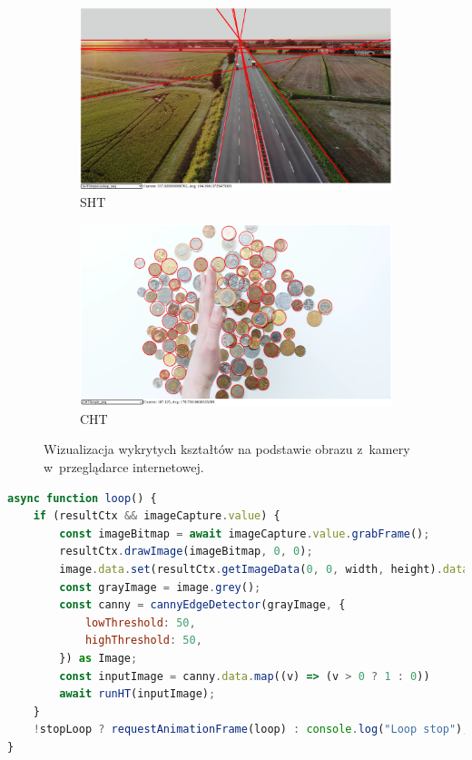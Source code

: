 \begin{figure}
    \centering
    \begin{subfigure}{0.48\textwidth}
        \centering
        \includegraphics[width=\linewidth]{img/road.png}
        \caption{SHT \cite{vid1}}\label{fig:road}
    \end{subfigure}\hfill
    \begin{subfigure}{0.48\textwidth}
        \centering
        \includegraphics[width=\linewidth]{img/money.png}
        \caption{CHT \cite{vid2}}\label{fig:money}
    \end{subfigure}
    \caption{Wizualizacja wykrytych kształtów na podstawie obrazu z~kamery w~przeglądarce internetowej.}
    \label{fig:road-money}
\end{figure}

\begin{lstlisting}[language=JavaScript, float=ht, label=lst:loop, caption=Funkcja przetwarzająca w~pętli kolejne klatki obrazu z~kamery.]
async function loop() {
    if (resultCtx && imageCapture.value) {
        const imageBitmap = await imageCapture.value.grabFrame();
        resultCtx.drawImage(imageBitmap, 0, 0);
        image.data.set(resultCtx.getImageData(0, 0, width, height).data);
        const grayImage = image.grey();
        const canny = cannyEdgeDetector(grayImage, {
            lowThreshold: 50,
            highThreshold: 50,
        }) as Image;
        const inputImage = canny.data.map((v) => (v > 0 ? 1 : 0))
        await runHT(inputImage);
    }
    !stopLoop ? requestAnimationFrame(loop) : console.log("Loop stop");
}
\end{lstlisting}

